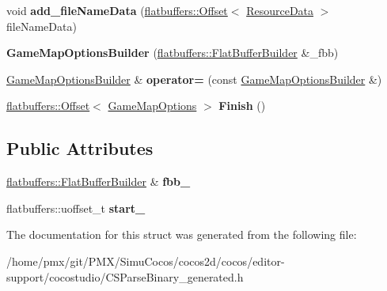 \begin{DoxyCompactItemize}
\item 
\mbox{\label{structflatbuffers_1_1GameMapOptionsBuilder_aa656d921622a241614b306e484c61401}} 
void {\bfseries add\+\_\+file\+Name\+Data} (\hyperlink{structflatbuffers_1_1Offset}{flatbuffers\+::\+Offset}$<$ \hyperlink{structflatbuffers_1_1ResourceData}{Resource\+Data} $>$ file\+Name\+Data)
\item 
\mbox{\label{structflatbuffers_1_1GameMapOptionsBuilder_a3060be639960055b2c1796fcdb5f70f5}} 
{\bfseries Game\+Map\+Options\+Builder} (\hyperlink{classflatbuffers_1_1FlatBufferBuilder}{flatbuffers\+::\+Flat\+Buffer\+Builder} \&\+\_\+fbb)
\item 
\mbox{\label{structflatbuffers_1_1GameMapOptionsBuilder_a727b673a620de85b9562811c508d1fe9}} 
\hyperlink{structflatbuffers_1_1GameMapOptionsBuilder}{Game\+Map\+Options\+Builder} \& {\bfseries operator=} (const \hyperlink{structflatbuffers_1_1GameMapOptionsBuilder}{Game\+Map\+Options\+Builder} \&)
\item 
\mbox{\label{structflatbuffers_1_1GameMapOptionsBuilder_a188d269b583bb889447caca11f181878}} 
\hyperlink{structflatbuffers_1_1Offset}{flatbuffers\+::\+Offset}$<$ \hyperlink{structflatbuffers_1_1GameMapOptions}{Game\+Map\+Options} $>$ {\bfseries Finish} ()
\end{DoxyCompactItemize}
\subsection*{Public Attributes}
\begin{DoxyCompactItemize}
\item 
\mbox{\label{structflatbuffers_1_1GameMapOptionsBuilder_a6bbd0b9c5b043a51ba8f001023d7f446}} 
\hyperlink{classflatbuffers_1_1FlatBufferBuilder}{flatbuffers\+::\+Flat\+Buffer\+Builder} \& {\bfseries fbb\+\_\+}
\item 
\mbox{\label{structflatbuffers_1_1GameMapOptionsBuilder_a5b61c0ba3547e940209f474d9ac50af6}} 
flatbuffers\+::uoffset\+\_\+t {\bfseries start\+\_\+}
\end{DoxyCompactItemize}


The documentation for this struct was generated from the following file\+:\begin{DoxyCompactItemize}
\item 
/home/pmx/git/\+P\+M\+X/\+Simu\+Cocos/cocos2d/cocos/editor-\/support/cocostudio/C\+S\+Parse\+Binary\+\_\+generated.\+h\end{DoxyCompactItemize}
